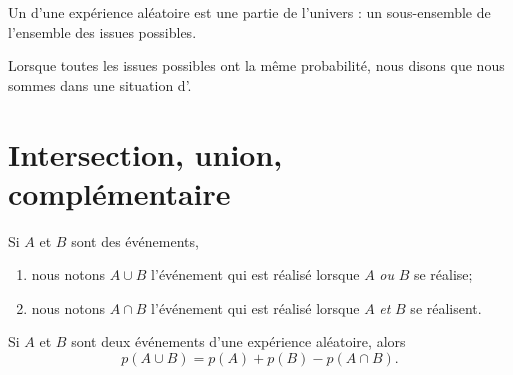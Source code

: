 \begin{definition}
    Un  d'une expérience aléatoire est une partie de l'univers : un sous-ensemble de l'ensemble des issues possibles.
\end{definition}

\begin{definition}
    Lorsque toutes les issues possibles ont la même probabilité, nous disons que nous sommes dans une situation d'.
\end{definition}

\section{Intersection, union, complémentaire}


Si \( A\) et \( B\) sont des événements, 
\begin{enumerate}
    \item
nous notons \( A\cup B\) l'événement qui est réalisé lorsque \( A\) \emph{ou} \( B\) se réalise;
\item
nous notons \( A\cap B\) l'événement qui est réalisé lorsque \( A\) \emph{et} \( B\) se réalisent.
\end{enumerate}

\begin{Aretenir}
    Si \( A\) et \( B\) sont deux événements d'une expérience aléatoire, alors
    \begin{equation}
        p(A\cup B)=p(A)+p(B)-p(A\cap B).
    \end{equation}
\end{Aretenir}

